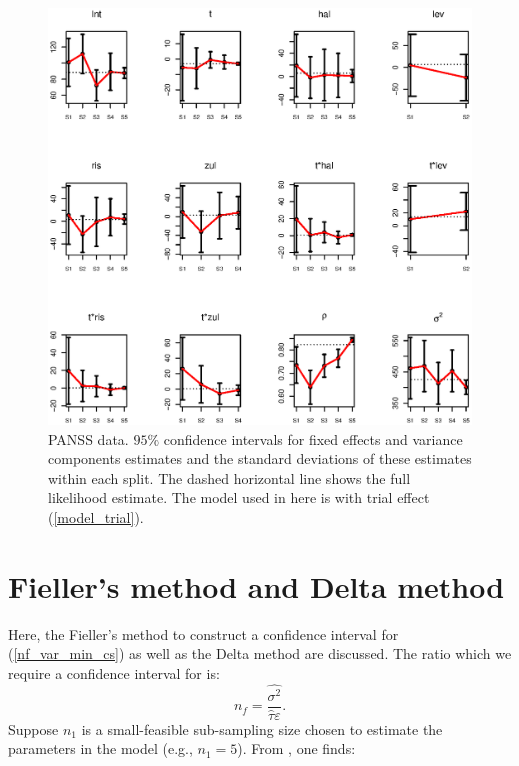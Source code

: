 \documentclass[11pt,a5paper,twoside]{book}
\begin{document}
{\begin{figure}[ht]
\centering
\includegraphics[width=\textwidth]{with_trial_split_by_split.eps}
\caption[PANSS data. $95\%$ confidence intervals for fixed effects and variance components estimates and the standard deviations of these estimates within each split (with trial model)]{PANSS data. $95\%$ confidence intervals for fixed effects and variance components estimates and the standard deviations of these estimates within each split. The dashed horizontal line shows the full likelihood estimate. The model used in here is with trial effect (\ref{model_trial}).} \label{fig_with_trial_split}
\end{figure}




\section{Fieller's method and Delta method}
\label{app1}

Here, the Fieller's method to construct a confidence interval for (\ref{nf_var_min_cs}) as well as the Delta method  are discussed. The ratio which we require a confidence interval for is:
$$n_f=\frac{\hat{\sigma^2}}{\widehat{\tau} \varepsilon}.$$
Suppose $n_1$ is a small-feasible sub-sampling size chosen to estimate the parameters in the model (e.g., $n_1=5$). From \cite{Iddi2011}, one finds:



}
\end{document}
